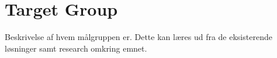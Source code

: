 \section{Target Group} \label{sec:target-group}

Beskrivelse af hvem målgruppen er. Dette kan læres ud fra de eksisterende løsninger samt research omkring emnet.

